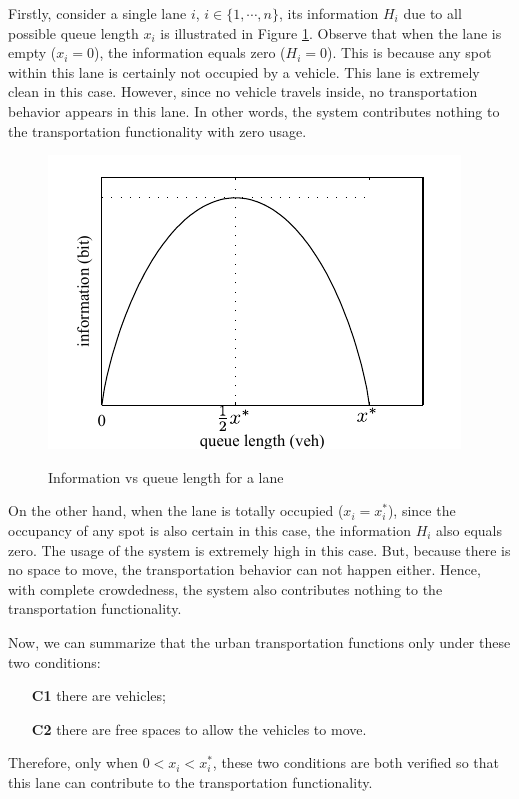 \documentclass[preprint,authoryear,12pt]{elsarticle}
\begin{document}
Firstly, consider a single lane $i$, $i\in\{1,\cdots,n\}$, its
information $H_i$ due to all possible queue length $x_i$ is
illustrated in Figure \ref{fig:info_lane}. Observe that when the lane
is empty ($x_i=0$), the information equals zero ($H_i=0$). This is
because any spot within this lane is certainly not occupied by a
vehicle. This lane is extremely clean in this case. However, since no
vehicle travels inside, no transportation behavior appears in this
lane. In other words, the system contributes nothing to the
transportation functionality with zero usage.

\begin{figure}[ht]
  \centering
  \includegraphics{pics/lane}\\
  \caption{Information vs queue length for a lane}
  \label{fig:info_lane}
\end{figure}

On the other hand, when the lane is totally occupied ($x_i=x_i^*$),
since the occupancy of any spot is also certain in this case, the
information $H_i$ also equals zero. The usage of the system is
extremely high in this case. But, because there is no space to move,
the transportation behavior can not happen either. Hence, with
complete crowdedness, the system also contributes nothing to the
transportation functionality.

Now, we can summarize that the urban transportation functions only
under these two conditions:
\begin{enumerate}
  \item[\textbf{C1}] there are vehicles; \label{list:c1}
  \item[\textbf{C2}] there are free spaces to allow the vehicles
      to move. \label{list:c2}
\end{enumerate}
Therefore, only when $0<x_i<x_i^*$, these two conditions are both
verified so that this lane can contribute to the transportation
functionality.
\end{document}
